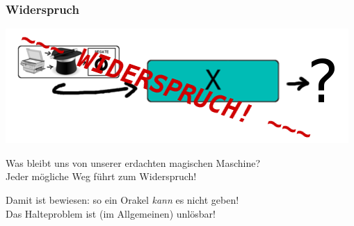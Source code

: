 \documentclass[aspectratio=169]{beamer}
\begin{document}
\begin{frame}
\frametitle{Widerspruch}
\begin{center}
\includegraphics[scale=1.4]{images/input_contradiction.png} 
\bigskip

Was bleibt uns von unserer erdachten magischen Maschine?\\
Jeder mögliche Weg führt zum Widerspruch!
\bigskip

Damit ist bewiesen: so ein Orakel \emph{kann} es nicht geben!\\
Das Halteproblem ist (im Allgemeinen) unlösbar!
\end{center}
\end{frame}

\end{document}
